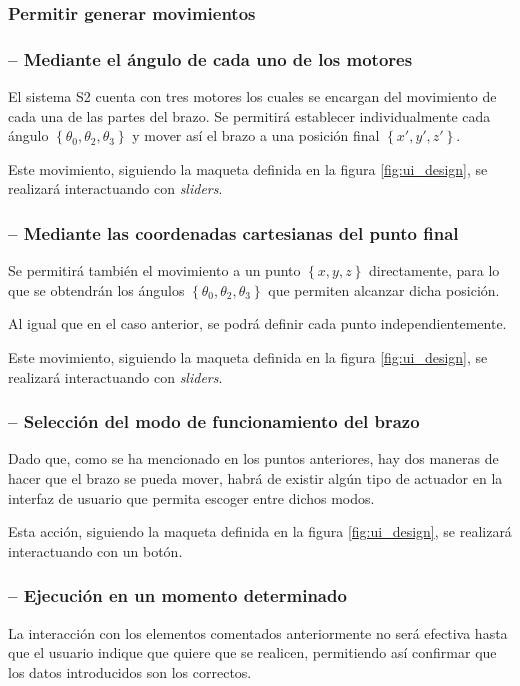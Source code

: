 \subsubsection{Permitir generar movimientos}
\subsubsection*{ -- Mediante el ángulo de cada uno de los motores}

El sistema \ac{S2} cuenta con tres motores los cuales se encargan del movimiento de cada una de las partes del
brazo. Se permitirá establecer individualmente cada ángulo $\left\{\theta_0, \theta_2, \theta_3\right\}$ 
y mover así el brazo a una posición final $\left\{x', y', z'\right\}$.

Este movimiento, siguiendo la maqueta definida en la figura \ref{fig:ui_design}, se realizará interactuando
con \textit{sliders}.

\subsubsection*{ -- Mediante las coordenadas cartesianas del punto final}
Se permitirá también el movimiento a un punto $\left\{x, y, z\right\}$ directamente, para lo que se obtendrán
los ángulos $\left\{\theta_0, \theta_2, \theta_3\right\}$ que permiten alcanzar dicha posición.

Al igual que en el caso anterior, se podrá definir cada punto independientemente.

Este movimiento, siguiendo la maqueta definida en la figura \ref{fig:ui_design}, se realizará interactuando
con \textit{sliders}.

\subsubsection*{ -- Selección del modo de funcionamiento del brazo}
Dado que, como se ha mencionado en los puntos anteriores, hay dos maneras de hacer que el brazo se pueda
mover, habrá de existir algún tipo de actuador en la interfaz de usuario que permita escoger entre dichos modos.

Esta acción, siguiendo la maqueta definida en la figura \ref{fig:ui_design}, se realizará interactuando con
un botón.

\subsubsection*{ -- Ejecución en un momento determinado}
La interacción con los elementos comentados anteriormente no será efectiva hasta que el usuario indique que
quiere que se realicen, permitiendo así confirmar que los datos introducidos son los correctos.

